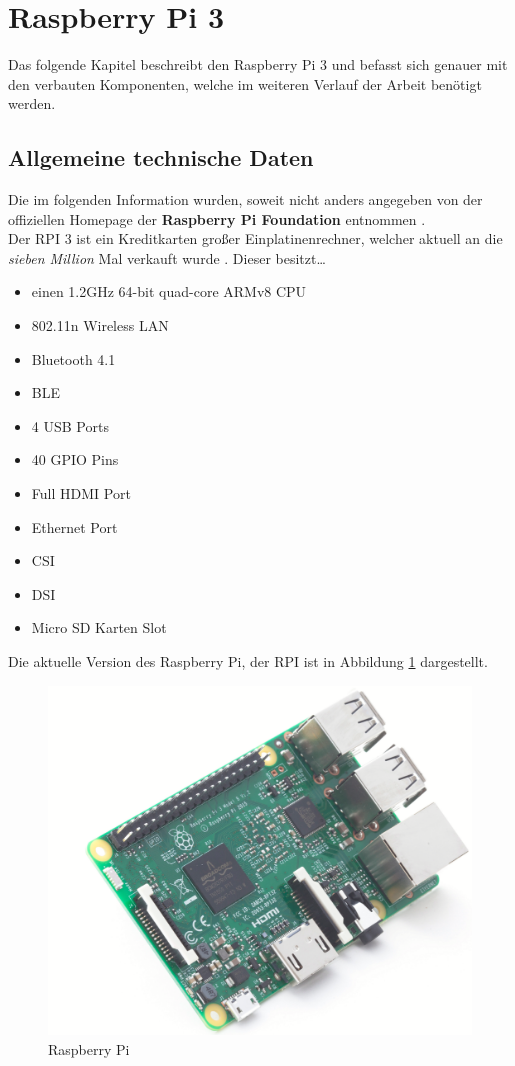 \section{Raspberry Pi 3}
\label{section_Raspberry_Pi3}
Das folgende Kapitel beschreibt den Raspberry Pi 3 und befasst sich genauer mit den verbauten Komponenten, welche im weiteren Verlauf der Arbeit benötigt werden. 

\subsection{Allgemeine technische Daten}
\label{subsection_Allgemeine_technische_Daten}
Die im folgenden Information wurden, soweit nicht anders angegeben von der offiziellen Homepage der \textbf{Raspberry Pi Foundation} entnommen \citep{RaspberryPiHomePage}.\\
Der \ac{RPI} 3 ist ein Kreditkarten großer Einplatinenrechner, welcher aktuell an die \textit{sieben Million} Mal verkauft wurde \citep{RPI_Verkaufszahlen}. Dieser besitzt\dots
\begin{itemize}
\item einen 1.2\;GHz 64-bit quad-core ARMv8 CPU
\item 802.11n Wireless LAN
\item Bluetooth 4.1
\item \ac{BLE}
\item 4 USB Ports
\item 40 GPIO Pins
\item Full HDMI Port
\item Ethernet Port
\item \ac{CSI}
\item \ac{DSI}
\item Micro SD Karten Slot
\end{itemize}

Die aktuelle Version des Raspberry Pi, der \ac{RPI} ist in Abbildung \ref{Abb_Bild_RPI3} dargestellt.

\begin{figure}[!h] 
  \centering
     \includegraphics[scale=.4]{BilderAllgemein/RPI3.png}
  \caption{Raspberry Pi \citep{RPI_Bild}}
  \label{Abb_Bild_RPI3}
\end{figure}

